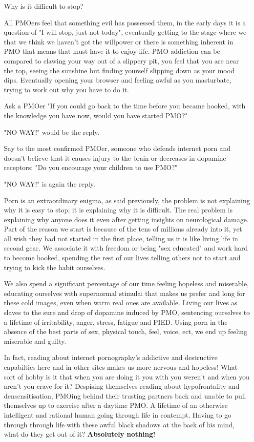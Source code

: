 Why is it difficult to stop?

All PMOers feel that something evil has possessed them, in the early days it is a question of "I will stop, just not today", eventually getting to the stage where we that we think we haven't got the willpower or there is something inherent in PMO that means that must have it to enjoy life. PMO addiction can be compared to clawing your way out of a slippery pit, you feel that you are near the top, seeing the sunshine but finding yourself slipping down as your mood dips. Eventually opening your browser and feeling awful as you masturbate, trying to work out why you have to do it.

Ask a PMOer "If you could go back to the time before you became hooked, with the knowledge you have now, would you have started PMO?"

"NO WAY!" would be the reply.

Say to the most confirmed PMOer, someone who defends internet porn and doesn't believe that it causes injury to the brain or decreases in dopamine receptors: "Do you encourage your children to use PMO?"

"NO WAY!" is again the reply.

Porn is an extraordinary enigma, as said previously, the problem is not explaining why it is easy to stop; it is explaining why it is difficult. The real problem is explaining why anyone does it even after getting insights on neurological damage. Part of the reason we start is because of the tens of millions already into it, yet all wish they had not started in the first place, telling us it is like living life in second gear. We associate it with freedom or being "sex educated" and work hard to become hooked, spending the rest of our lives telling others not to start and trying to kick the habit ourselves.

We also spend a significant percentage of our time feeling hopeless and miserable, educating ourselves with supernormal stimulai that makes us prefer and long for these cold images, even when warm real ones are available. Living our lives as slaves to the sure and drop of dopamine induced by PMO, sentencing ourselves to a lifetime of irritability, anger, stress, fatigue and PIED. Using porn in the absence of the best parts of sex, physical touch, feel, voice, ect, we end up feeling miserable and guilty.

In fact, reading about internet pornography's addictive and destructive capabilties here and in other sites makes us more nervous and hopeless! What sort of hobby is it that when you are doing it you with you weren't and when you aren't you crave for it? Despising themselves reading about hypofrontality and densensitisation, PMOing behind their trusting partners back and unable to pull themselves up to exercise after a daytime PMO. A lifetime of an otherwise intelligent and rational human going through life in contempt. Having to go through through life with these awful black shadows at the back of his mind, what do they get out of it? \textbf{Absolutely nothing!}

